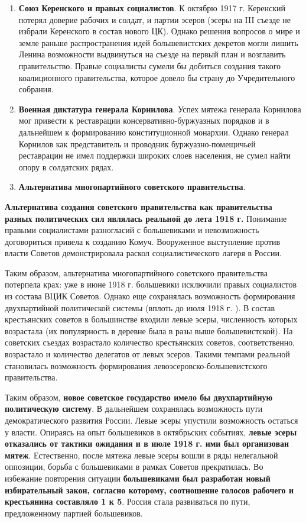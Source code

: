 \documentclass{article}
\begin{document}
\begin{enumerate}
    \item \textbf{Союз Керенского и правых социалистов}. К октябрю 1917 г. Керенский потерял доверие рабочих и солдат, и партии эсеров (эсеры на III съезде не избрали Керенского в состав нового ЦК). Однако решения вопросов о мире и земле раньше распространения идей большевистских декретов могли лишить Ленина возможности выдвинуться на съезде на первый план и возглавить правительство. Правые социалисты сумели бы добиться создания такого коалиционного правительства, которое довело бы страну до Учредительного собрания.
    \item \textbf{Военная диктатура генерала Корнилова}. Успех мятежа генерала Корнилова мог привести к реставрации консервативно-буржуазных порядков и в дальнейшем к формированию конституционной монархии. Однако генерал Корнилов как представитель и проводник буржуазно-помещичьей реставрации не имел поддержки широких слоев населения, не сумел найти опору в солдатских рядах.
    \item \textbf{Альтернатива многопартийного советского правительства}.
\end{enumerate}

\textbf{Альтернатива создания советского правительства как правительства разных политических сил являлась реальной до лета 1918 г.} Понимание правыми социалистами разногласий с большевиками и невозможность договориться привела к созданию Комуч. Вооруженное выступление против власти Советов демонстрировала раскол социалистического лагеря в России.

\hfill

Таким образом, альтернатива многопартийного советского правительства потерпела крах: уже в июне 1918 г. большевики исключили правых социалистов из состава ВЦИК Советов. Однако еще сохранялась возможность формирования двухпартийной политической системы (вплоть до июля 1918 г. ). В состав крестьянских советов в большинстве входили левые эсеры, численность которых возрастала (их популярность в деревне была в разы выше большевистской). На советских съездах возрастало количество крестьянских советов, соответственно, возрастало и количество делегатов от левых эсеров. Такими темпами реальной становилась возможность формирования левоэсеровско-большевистского правительства.

\hfill

Таким образом, \textbf{новое советское государство имело бы двухпартийную политическую систему}. В дальнейшем сохранялась возможность пути демократического развития России. Левые эсеры упустили возможность остаться у власти. Опираясь на опыт большевиков в октябрьских событиях, \textbf{левые эсеры отказались от тактики ожидания и в июле 1918 г. ими был организован мятеж}. Естественно, после мятежа левые эсеры вошли в ряды нелегальной оппозиции, борьба с большевиками в рамках Советов прекратилась. Во избежание повторения ситуации \textbf{большевиками был разработан новый избирательный закон, согласно которому, соотношение голосов рабочего и крестьянина составляло 1 к 5}. Россия стала развиваться по пути, предложенному партией большевиков.
\end{document}
